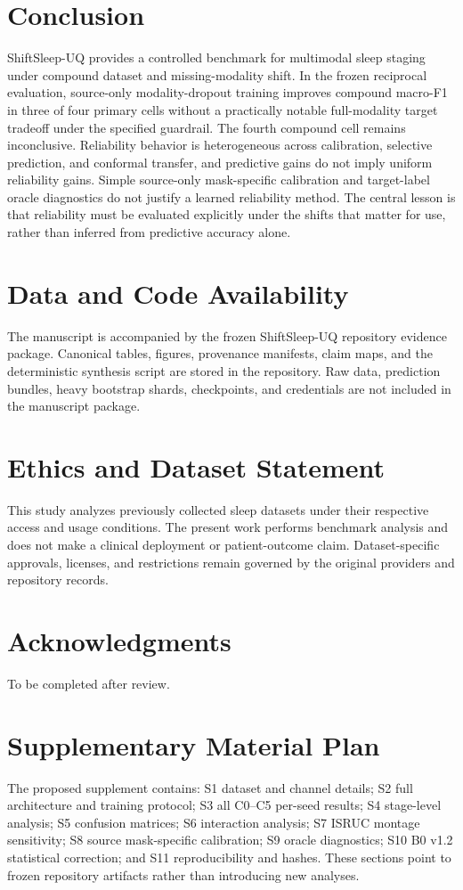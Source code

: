\documentclass[10pt,twocolumn]{article}
\begin{document}
\section{Conclusion}
ShiftSleep-UQ provides a controlled benchmark for multimodal sleep staging under compound dataset and missing-modality shift. In the frozen reciprocal evaluation, source-only modality-dropout training improves compound macro-F1 in three of four primary cells without a practically notable full-modality target tradeoff under the specified guardrail. The fourth compound cell remains inconclusive. Reliability behavior is heterogeneous across calibration, selective prediction, and conformal transfer, and predictive gains do not imply uniform reliability gains. Simple source-only mask-specific calibration and target-label oracle diagnostics do not justify a learned reliability method. The central lesson is that reliability must be evaluated explicitly under the shifts that matter for use, rather than inferred from predictive accuracy alone.

\section{Data and Code Availability}
The manuscript is accompanied by the frozen ShiftSleep-UQ repository evidence package. Canonical tables, figures, provenance manifests, claim maps, and the deterministic synthesis script are stored in the repository. Raw data, prediction bundles, heavy bootstrap shards, checkpoints, and credentials are not included in the manuscript package.

\section{Ethics and Dataset Statement}
This study analyzes previously collected sleep datasets under their respective access and usage conditions. The present work performs benchmark analysis and does not make a clinical deployment or patient-outcome claim. Dataset-specific approvals, licenses, and restrictions remain governed by the original providers and repository records.

\section*{Acknowledgments}
To be completed after review.




\appendix
\section{Supplementary Material Plan}
The proposed supplement contains: S1 dataset and channel details; S2 full architecture and training protocol; S3 all C0--C5 per-seed results; S4 stage-level analysis; S5 confusion matrices; S6 interaction analysis; S7 ISRUC montage sensitivity; S8 source mask-specific calibration; S9 oracle diagnostics; S10 B0 v1.2 statistical correction; and S11 reproducibility and hashes. These sections point to frozen repository artifacts rather than introducing new analyses.
\end{document}
